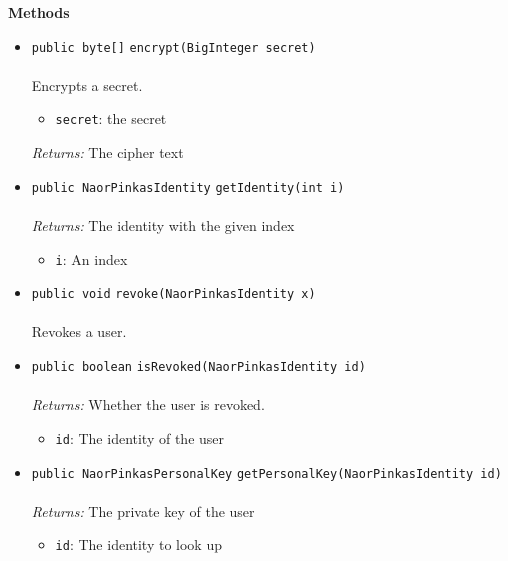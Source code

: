 \textbf{\sffamily Methods}
\begin{itemize}
\item \lstinline|public byte[]| \lstinline|encrypt|\lstinline|(BigInteger secret)|\\ \\[-0.6em]
Encrypts a secret.
\begin{itemize}
\item \lstinline|secret|: the secret
\end{itemize}

\emph{Returns:} The cipher text

\item \lstinline|public NaorPinkasIdentity| \lstinline|getIdentity|\lstinline|(int i)|\\ \\[-0.6em]
\emph{Returns:} The identity with the given index
\begin{itemize}
\item \lstinline|i|: An index
\end{itemize}



\item \lstinline|public void| \lstinline|revoke|\lstinline|(NaorPinkasIdentity x)|\\ \\[-0.6em]
Revokes a user.



\item \lstinline|public boolean| \lstinline|isRevoked|\lstinline|(NaorPinkasIdentity id)|\\ \\[-0.6em]
\emph{Returns:} Whether the user is revoked.
\begin{itemize}
\item \lstinline|id|: The identity of the user
\end{itemize}



\item \lstinline|public NaorPinkasPersonalKey| \lstinline|getPersonalKey|\lstinline|(NaorPinkasIdentity id)|\\ \\[-0.6em]
\emph{Returns:} The private key of the user
\begin{itemize}
\item \lstinline|id|: The identity to look up
\end{itemize}



\end{itemize}

